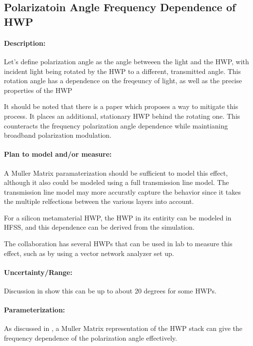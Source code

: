\subsection{Polarizatoin Angle Frequency Dependence of HWP}

\paragraph{Description:}

Let's define polarization angle as the angle betweeen the light and the HWP, with incident light being rotated by the HWP to a different, transmitted angle.  This rotation angle has a dependence on the freqeuncy of light, as well as the precise properties of the HWP

It should be noted that there is a paper which proposes a way to mitigate this process\cite{Matsumura14}.  It places an additional, stationary HWP behind the rotating one.  This counteracts the frequency polarization angle dependence while maintianing broadband polarization modulation. 

\paragraph{Plan to model and/or measure:}
A Muller Matrix paramaterization should be sufficient to model this effect, although it also could be modeled using a full transmission line model.  The transmission line model may more accuratly capture the behavior since it takes the multiple relfections between the various layers into account.

For a silicon metamaterial HWP, the HWP in its entirity can be modeled in HFSS, and this dependence can be derived from the simulation.

The collaboration has several HWPs that can be used in lab to measure this effect, such as by using a vector network analyzer set up.

\paragraph{Uncertainty/Range:}
Discussion in \cite{Matsumura09} show this can be up to about 20 degrees for some HWPs.




\paragraph{Parameterization:}

As discussed in \cite{Matsumura09}, a Muller Matrix representation of the HWP stack can give the frequency dependence of the polarization angle effectively.


